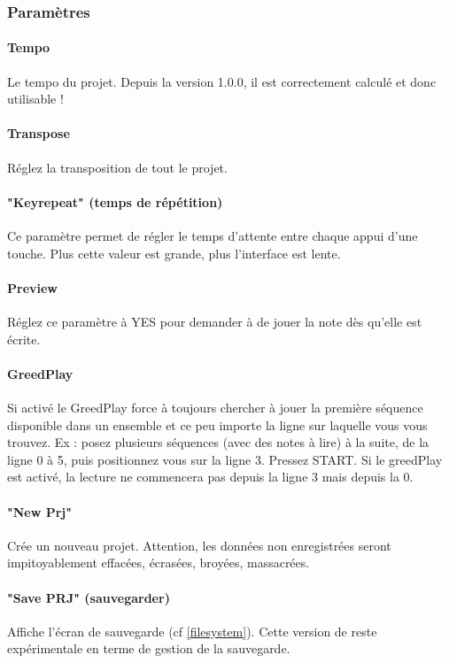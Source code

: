 \documentclass[12pt,a4paper]{article}
\begin{document}
        \subsubsection{Paramètres}
        
        \paragraph{Tempo} Le tempo du projet. Depuis la version 1.0.0, il est correctement calculé et donc utilisable !

        \paragraph{Transpose} Réglez la transposition de tout le projet.
        
        \paragraph{"Keyrepeat" (temps de répétition)} Ce paramètre permet de régler le temps d'attente entre chaque appui d'une touche. Plus cette valeur est grande, plus l'interface est lente.

        \paragraph{Preview} Réglez ce paramètre à YES pour demander à \FAT de jouer la note dès qu'elle est écrite.

        \paragraph{GreedPlay} Si activé le GreedPlay force \FAT à toujours chercher à jouer la première séquence disponible dans un ensemble et ce peu importe la ligne sur laquelle vous vous trouvez. Ex : posez plusieurs séquences (avec des notes à lire) à la suite, de la ligne 0 à 5, puis positionnez vous sur la ligne 3. Pressez START. Si le greedPlay est activé, la lecture ne commencera pas depuis la ligne 3 mais depuis la 0.

        \paragraph{"New Prj"} Crée un nouveau projet. Attention, les données non enregistrées seront impitoyablement effacées, écrasées, broyées, massacrées.
        
        \paragraph{"Save PRJ" (sauvegarder)}  Affiche l'écran de sauvegarde (cf \ref{filesystem}). Cette version de \FAT reste expérimentale en terme de gestion de la sauvegarde.
        
\end{document}
